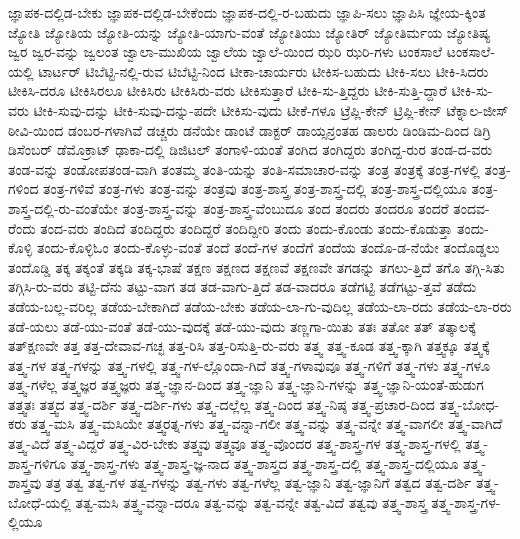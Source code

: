 {ಜ್ಞಾಪಕ-ದಲ್ಲಿಡ-ಬೇಕು
ಜ್ಞಾಪಕ-ದಲ್ಲಿಡ-ಬೇಕೆಂದು
ಜ್ಞಾಪಕ-ದಲ್ಲಿ-ರ-ಬಹುದು
ಜ್ಞಾಪಿ-ಸಲು
ಜ್ಞಾಪಿಸಿ
ಜ್ಞೇಯ-ಕ್ಕಿಂತ
ಜ್ಯೋತಿ
ಜ್ಯೋತಿಯ
ಜ್ಯೋತಿ-ಯನ್ನು
ಜ್ಯೋತಿ-ಯಾಗು-ವಂತೆ
ಜ್ಯೋತಿಯು
ಜ್ಯೋತಿರ್
ಜ್ಯೋತಿರ್ಮಯ
ಜ್ಯೋತಿಷ್ಯ
ಜ್ವರ
ಜ್ವರ-ವನ್ನು
ಜ್ವಲಂತ
ಜ್ವಾಲಾ-ಮುಖಿಯ
ಜ್ವಾಲೆಯ
ಜ್ವಾಲೆ-ಯಿಂದ
ಝರಿ
ಝರಿ-ಗಳು
ಟಂಕಸಾಲೆ
ಟಂಕಸಾಲೆ-ಯಲ್ಲಿ
ಟಾರ್ಟರ್
ಟಿಬೆಟ್ಟಿ-ನಲ್ಲಿ-ರುವ
ಟಿಬೆಟ್ಟಿ-ನಿಂದ
ಟೀಕಾ-ಚಾರ್ಯರು
ಟೀಕಿಸ-ಬಹುದು
ಟೀಕಿ-ಸಲು
ಟೀಕಿ-ಸಿದರು
ಟೀಕಿಸಿ-ದರೂ
ಟೀಕಿಸಿರಲೂ
ಟೀಕಿಸಿರು
ಟೀಕಿಸಿರು-ವರು
ಟೀಕಿಸುತ್ತಾರೆ
ಟೀಕಿ-ಸು-ತ್ತಿದ್ದರು
ಟೀಕಿ-ಸುತ್ತಿ-ದ್ದಾರೆ
ಟೀಕಿ-ಸು-ವರು
ಟೀಕಿ-ಸುವು-ದನ್ನು
ಟೀಕಿ-ಸುವು-ದನ್ನು-ಪದೇ
ಟೀಕಿಸು-ವುದು
ಟೀಕೆ-ಗಳೂ
ಟ್ರೆಪ್ಲಿ-ಕೇನ್
ಟ್ರಿಪ್ಲಿ-ಕೇನ್
ಟೆಕ್ನಾಲ-ಜೀಸ್
ಠೀವಿ-ಯಿಂದ
ಡಂಬರ-ಗಳಾಗಿವೆ
ಡಚ್ಚರು
ಡನೆಯೇ
ಡಾಂಟೆ
ಡಾಕ್ಟರ್
ಡಾಯ್ಸನ್ರಂತಹ
ಡಾಲರು
ಡಿಂಡಿಮ-ದಿಂದ
ಡಿಗ್ರಿ
ಡಿಸೆಂಬರ್
ಡೆಮೊಕ್ರಾಟ್
ಢಾಕಾ-ದಲ್ಲಿ
ಡಿಜಿಟಲ್
ತಂಗಾಳಿ-ಯಂತೆ
ತಂಗಿದ
ತಂಗಿದ್ದರು
ತಂಗಿದ್ದ-ರುರ
ತಂಡ-ದ-ವರು
ತಂಡ-ವನ್ನು
ತಂಡೋಪತಂಡ-ವಾಗಿ
ತಂತಮ್ಮ
ತಂತಿ-ಯನ್ನು
ತಂತಿ-ಸಮಾಚಾರ-ವನ್ನು
ತಂತ್ರ
ತಂತ್ರಕ್ಕೆ
ತಂತ್ರ-ಗಳಲ್ಲಿ
ತಂತ್ರ-ಗಳಿಂದ
ತಂತ್ರ-ಗಳಿವೆ
ತಂತ್ರ-ಗಳು
ತಂತ್ರ-ವನ್ನು
ತಂತ್ರವು
ತಂತ್ರ-ಶಾಸ್ತ್ರ
ತಂತ್ರ-ಶಾಸ್ತ್ರ-ದಲ್ಲಿ
ತಂತ್ರ-ಶಾಸ್ತ್ರ-ದಲ್ಲಿಯೂ
ತಂತ್ರ-ಶಾಸ್ತ್ರ-ದಲ್ಲಿ-ರು-ವಂತೆಯೇ
ತಂತ್ರ-ಶಾಸ್ತ್ರ-ವನ್ನು
ತಂತ್ರ-ಶಾಸ್ತ್ರ-ವೆಂಬುದೂ
ತಂದ
ತಂದರು
ತಂದರೂ
ತಂದರೆ
ತಂದವ-ರೆಂದು
ತಂದ-ವರು
ತಂದಿದೆ
ತಂದಿದ್ದರು
ತಂದಿದ್ದರೆ
ತಂದಿದ್ದೀರಿ
ತಂದು
ತಂದು-ಕೊಂಡು
ತಂದು-ಕೊಡುತ್ತಾ
ತಂದು-ಕೊಳ್ಳಿ
ತಂದು-ಕೊಳ್ಳಿಓಂ
ತಂದು-ಕೊಳ್ಳು-ವಂತೆ
ತಂದೆ
ತಂದೆ-ಗಳ
ತಂದೆಗೆ
ತಂದೆಯ
ತಂದೊ-ಡ-ನೆಯೇ
ತಂದೊಡ್ಡಲು
ತಂದೊಡ್ಡಿ
ತಕ್ಕ
ತಕ್ಕಂತೆ
ತಕ್ಕಡಿ
ತಕ್ಕ-ಭಾಷೆ
ತಕ್ಷಣ
ತಕ್ಷಣದ
ತಕ್ಷಣವೆ
ತಕ್ಷಣವೇ
ತಗಡನ್ನು
ತಗಲು-ತ್ತಿದೆ
ತಗೊ
ತಗ್ಗಿ-ಸಿತು
ತಗ್ಗಿಸಿ-ರು-ವರು
ತಟ್ಟಿ-ದೆನು
ತಟ್ಟು-ವಾಗ
ತಡ
ತಡ-ವಾಗು-ತ್ತಿದೆ
ತಡ-ವಾದರೂ
ತಡೆಗಟ್ಟಿ
ತಡೆಗಟ್ಟು-ತ್ತವೆ
ತಡೆದು
ತಡೆಯ-ಬಲ್ಲ-ವರಿಲ್ಲ
ತಡೆಯ-ಬೇಕಾಗಿದೆ
ತಡೆಯ-ಬೇಕು
ತಡೆಯ-ಲಾ-ಗು-ವುದಿಲ್ಲ
ತಡೆಯ-ಲಾ-ರದು
ತಡೆಯ-ಲಾ-ರರು
ತಡೆ-ಯಲು
ತಡೆ-ಯು-ವಂತೆ
ತಡೆ-ಯು-ವುದಕ್ಕೆ
ತಡೆ-ಯು-ವುದು
ತಣ್ಣಗಾ-ಯಿತು
ತತಃ
ತತೋ
ತತ್
ತತ್ಕಾಲಕ್ಕೆ
ತತ್ಕ್ಷಣವೇ
ತತ್ತ
ತತ್ತ-ದೇವಾವ-ಗಚ್ಛ
ತತ್ತ-ರಿಸಿ
ತತ್ತ-ರಿಸುತ್ತಿ-ರು-ವರು
ತತ್ತ್ವ
ತತ್ತ್ವ-ಕೂಡ
ತತ್ತ್ವ-ಕ್ಕಾಗಿ
ತತ್ತ್ವಕ್ಕೂ
ತತ್ತ್ವಕ್ಕೆ
ತತ್ತ್ವ-ಗಳ
ತತ್ತ್ವ-ಗಳನ್ನು
ತತ್ತ್ವ-ಗಳಲ್ಲಿ
ತತ್ತ್ವ-ಗಳ-ಲ್ಲೊಂದಾ-ಗಿದೆ
ತತ್ತ್ವ-ಗಳಾವುವೂ
ತತ್ತ್ವ-ಗಳಿಗೆ
ತತ್ತ್ವ-ಗಳು
ತತ್ತ್ವ-ಗಳೂ
ತತ್ತ್ವ-ಗಳೆಲ್ಲ
ತತ್ತ್ವಜ್ಞರ
ತತ್ತ್ವಜ್ಞರು
ತತ್ತ್ವ-ಜ್ಞಾನ-ದಿಂದ
ತತ್ತ್ವ-ಜ್ಞಾನಿ
ತತ್ತ್ವ-ಜ್ಞಾನಿ-ಗಳನ್ನು
ತತ್ತ್ವ-ಜ್ಞಾನಿ-ಯಂತೆ-ಹುಡುಗ
ತತ್ತ್ವತಃ
ತತ್ತ್ವದ
ತತ್ತ್ವ-ದರ್ಶಿ
ತತ್ತ್ವ-ದರ್ಶಿ-ಗಳು
ತತ್ತ್ವ-ದಲ್ಲೆಲ್ಲ
ತತ್ತ್ವ-ದಿಂದ
ತತ್ತ್ವ-ನಿಷ್ಠ
ತತ್ತ್ವ-ಪ್ರಚಾರ-ದಿಂದ
ತತ್ತ್ವ-ಬೋಧ-ಕರು
ತತ್ತ್ವ-ಮಸಿ
ತತ್ತ್ವ-ಮಸಿಯೇ
ತತ್ತ್ವರತ್ನ-ಗಳು
ತತ್ತ್ವ-ವನ್ನಾ-ಗಲೀ
ತತ್ತ್ವ-ವನ್ನು
ತತ್ತ್ವ-ವನ್ನೇ
ತತ್ತ್ವ-ವಾಗಲೀ
ತತ್ತ್ವ-ವಾಗಿದೆ
ತತ್ತ್ವ-ವಿದೆ
ತತ್ತ್ವ-ವಿದ್ದರೆ
ತತ್ತ್ವ-ವಿರ-ಬೇಕು
ತತ್ತ್ವವು
ತತ್ತ್ವವೂ
ತತ್ತ್ವ-ವೊಂದರ
ತತ್ತ್ವ-ಶಾಸ್ತ್ರ-ಗಳ
ತತ್ತ್ವ-ಶಾಸ್ತ್ರ-ಗಳಲ್ಲಿ
ತತ್ತ್ವ-ಶಾಸ್ತ್ರ-ಗಳಿಗೂ
ತತ್ತ್ವ-ಶಾಸ್ತ್ರ-ಗಳು
ತತ್ತ್ವ-ಶಾಸ್ತ್ರ-ಜ್ಞ-ನಾದ
ತತ್ತ್ವ-ಶಾಸ್ತ್ರದ
ತತ್ತ್ವ-ಶಾಸ್ತ್ರ-ದಲ್ಲಿ
ತತ್ತ್ವ-ಶಾಸ್ತ್ರ-ದಲ್ಲಿಯೂ
ತತ್ತ್ವ-ಶಾಸ್ತ್ರವು
ತತ್ರ
ತತ್ವ
ತತ್ವ-ಗಳ
ತತ್ವ-ಗಳನ್ನು
ತತ್ವ-ಗಳು
ತತ್ವ-ಗಳೆಲ್ಲ
ತತ್ವ-ಜ್ಞಾನಿ
ತತ್ವ-ಜ್ಞಾನಿಗೆ
ತತ್ವದ
ತತ್ವ-ದರ್ಶಿ
ತತ್ತ್ವ-ಬೋಧೆ-ಯಲ್ಲಿ
ತತ್ವ-ಮಸಿ
ತತ್ತ್ವ-ವನ್ನಾ-ದರೂ
ತತ್ವ-ವನ್ನು
ತತ್ವ-ವನ್ನೇ
ತತ್ವ-ವಿದೆ
ತತ್ವವು
ತತ್ತ್ವ-ಶಾಸ್ತ್ರ
ತತ್ತ್ವ-ಶಾಸ್ತ್ರ-ಗಳ-ಲ್ಲಿಯೂ
}
